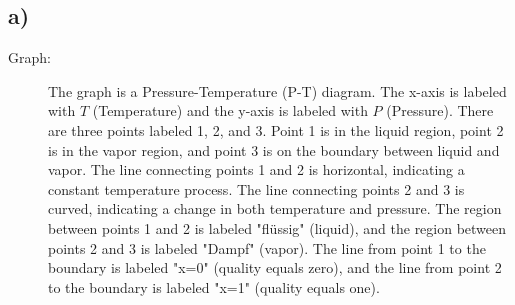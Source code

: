 

\subsection*{a)}

\begin{description}
    \item[Graph:] The graph is a Pressure-Temperature (P-T) diagram. The x-axis is labeled with $T$ (Temperature) and the y-axis is labeled with $P$ (Pressure). There are three points labeled 1, 2, and 3. Point 1 is in the liquid region, point 2 is in the vapor region, and point 3 is on the boundary between liquid and vapor. The line connecting points 1 and 2 is horizontal, indicating a constant temperature process. The line connecting points 2 and 3 is curved, indicating a change in both temperature and pressure. The region between points 1 and 2 is labeled "flüssig" (liquid), and the region between points 2 and 3 is labeled "Dampf" (vapor). The line from point 1 to the boundary is labeled "x=0" (quality equals zero), and the line from point 2 to the boundary is labeled "x=1" (quality equals one).
\end{description}